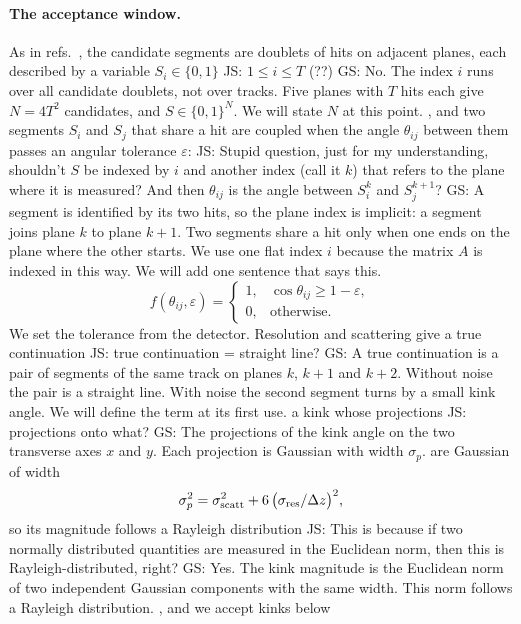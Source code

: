 \documentclass[11pt,a4paper]{article}
\newcommand{\js}[1]{{\color{blue} JS: #1 }}
\newcommand{\gs}[1]{{\color{orange!85!black} GS: #1 }}
\begin{document}
\paragraph{The acceptance window.}
As in refs.~\cite{nicotra2023,trackhhl}, the candidate segments are doublets of hits on adjacent
planes, each described by a variable $S_i\in\{0,1\}$ \js{$1 \leq i \leq T$ (??)} \gs{No. The index $i$ runs over all candidate doublets, not over tracks. Five planes with $T$ hits each give $N=4T^2$ candidates, and $S\in\{0,1\}^N$. We will state $N$ at this point.}, and two segments $S_i$ and $S_j$ that share a
hit are coupled when the angle $\theta_{ij}$ between them passes an angular tolerance $\varepsilon$: \js{Stupid question, just for my understanding, shouldn't $S$ be indexed by $i$ and another index (call it $k$) that refers to the plane where it is measured? And then $\theta_{ij}$ is the angle between $S_i^k$ and $S_j^{k+1}$?} \gs{A segment is identified by its two hits, so the plane index is implicit: a segment joins plane $k$ to plane $k+1$. Two segments share a hit only when one ends on the plane where the other starts. We use one flat index $i$ because the matrix $A$ is indexed in this way. We will add one sentence that says this.}
\begin{equation} 
f(\theta_{ij},\varepsilon)=\begin{cases}1,&\cos\theta_{ij}\ge1-\varepsilon,\\0,&\text{otherwise}.\end{cases}
\end{equation}
We set the tolerance from the detector. Resolution and scattering give a true continuation \js{true continuation = straight line?} \gs{A true continuation is a pair of segments of the same track on planes $k$, $k+1$ and $k+2$. Without noise the pair is a straight line. With noise the second segment turns by a small kink angle. We will define the term at its first use.} a kink
whose projections \js{projections onto what?} \gs{The projections of the kink angle on the two transverse axes $x$ and $y$. Each projection is Gaussian with width $\sigma_p$.} are Gaussian of width
\begin{equation}
\sigma_p^2=\sigma_{\rm scatt}^2+6\,\big(\sigma_{\rm res}/\Delta z\big)^2 ,
\end{equation}
so its magnitude follows a Rayleigh distribution \js{This is because if two normally distributed quantities are measured in the Euclidean norm, then this is Rayleigh-distributed, right?} \gs{Yes. The kink magnitude is the Euclidean norm of two independent Gaussian components with the same width. This norm follows a Rayleigh distribution.}, and we accept kinks below
\end{document}
